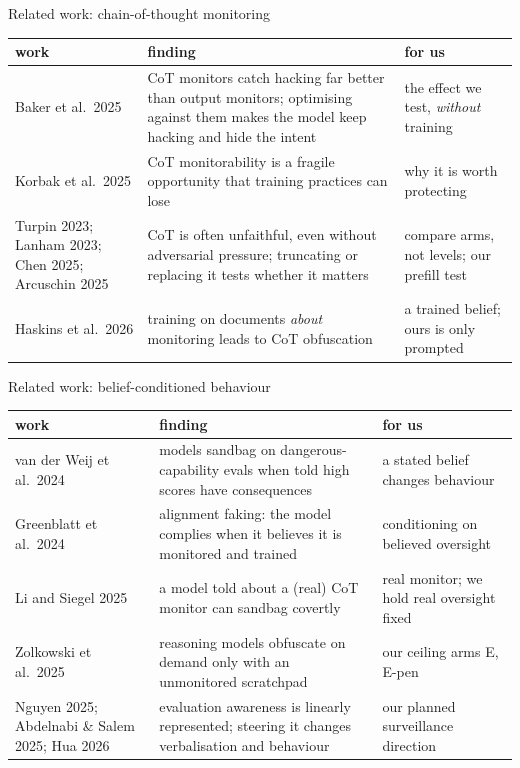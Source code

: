 \documentclass[10pt]{beamer}
\begin{document}
\begin{frame}{Related work: chain-of-thought monitoring}
\vfill
\footnotesize
\renewcommand{\arraystretch}{1.4}
\begin{tabularx}{\textwidth}{@{}>{\raggedright\arraybackslash}p{2.7cm}>{\raggedright\arraybackslash}X>{\raggedright\arraybackslash}p{3.0cm}@{}}
\toprule
work & finding & for us\\
\midrule
Baker et al.\ 2025 & CoT monitors catch hacking far better than output monitors; optimising against them makes the model keep hacking and hide the intent & the effect we test, \emph{without} training\\
Korbak et al.\ 2025 & CoT monitorability is a fragile opportunity that training practices can lose & why it is worth protecting\\
Turpin 2023; Lanham 2023; Chen 2025; Arcuschin 2025 & CoT is often unfaithful, even without adversarial pressure; truncating or replacing it tests whether it matters & compare arms, not levels; our prefill test\\
Haskins et al.\ 2026 & training on documents \emph{about} monitoring leads to CoT obfuscation & a trained belief; ours is only prompted\\
\bottomrule
\end{tabularx}
\vfill
\end{frame}

\begin{frame}{Related work: belief-conditioned behaviour}
\vfill
\footnotesize
\renewcommand{\arraystretch}{1.4}
\begin{tabularx}{\textwidth}{@{}>{\raggedright\arraybackslash}p{2.7cm}>{\raggedright\arraybackslash}X>{\raggedright\arraybackslash}p{3.0cm}@{}}
\toprule
work & finding & for us\\
\midrule
van der Weij et al.\ 2024 & models sandbag on dangerous-capability evals when told high scores have consequences & a stated belief changes behaviour\\
Greenblatt et al.\ 2024 & alignment faking: the model complies when it believes it is monitored and trained & conditioning on believed oversight\\
Li and Siegel 2025 & a model told about a (real) CoT monitor can sandbag covertly & real monitor; we hold real oversight fixed\\
Zolkowski et al.\ 2025 & reasoning models obfuscate on demand only with an unmonitored scratchpad & our ceiling arms E, E-pen\\
Nguyen 2025; Abdelnabi \& Salem 2025; Hua 2026 & evaluation awareness is linearly represented; steering it changes verbalisation and behaviour & our planned surveillance direction\\
\bottomrule
\end{tabularx}
\vfill
\end{frame}
\end{document}
